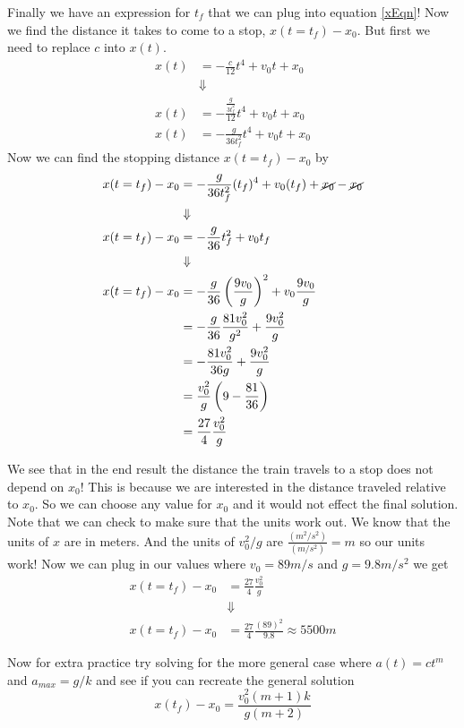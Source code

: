 \documentclass[11pt]{article}
\begin{document}
Finally we have an expression for $t_f$ that we can plug into equation \ref{xEqn}! Now we 
find the distance it takes to come to a stop, $x(t=t_f) - x_0$. But first we need to
replace $c$ into $x(t)$.
\begin{align*}
x(t) &= -\frac{c}{12}t^4 + v_0t + x_0\\
&\Downarrow\\
x(t) &= -\frac{\frac{g}{3t_f^2}}{12}t^4 + v_0t + x_0\\
x(t) &= -\frac{g}{36t_f^2}t^4 + v_0t + x_0
\end{align*}
Now we can find the stopping distance $x(t=t_f) - x_0$ by
\begin{align*}
x(t=t_f) - x_0 &= -\frac{g}{36t_f^2}(t_f)^4 + v_0(t_f) + \cancel{x_0} - \cancel{x_0}\\
&\Downarrow\\
x(t=t_f) - x_0 &= -\frac{g}{36}t_f^2 + v_0t_f\\
&\Downarrow\\
x(t=t_f) - x_0 &= -\frac{g}{36}\left(\frac{9v_0}{g}\right)^2 + v_0\frac{9v_0}{g}\\
&= -\frac{g}{36}\frac{81v_0^2}{g^2} + \frac{9v_0^2}{g}\\
&= -\frac{81v_0^2}{36g}  + \frac{9v_0^2}{g}\\
&= \frac{v_0^2}{g}\left(9-\frac{81}{36}\right)\\
&= \frac{27}{4}\frac{v_0^2}{g}
\end{align*}

We see that in the end result the distance the train travels to a stop does not depend on 
$x_0$! This is because we are interested in the distance traveled relative to $x_0$. So we
can choose any value for $x_0$ and it would not effect the final solution. 
Note that we can check to make sure that the units work out. We know that the units of $x$ 
are in meters. And the units of $v_0^2/g$ are $\frac{(m^2/s^2)}{(m/s^2)} = m$ so our units
work! Now we can plug in our values where $v_0 = 89\unit{m/s}$ and $g=9.8\unit{m/s^2}$ we 
get
\begin{align*}
x(t=t_f) - x_0 &= \frac{27}{4}\frac{v_0^2}{g}\\
&\Downarrow\\
x(t=t_f) - x_0 &= \frac{27}{4}\frac{(89)^2}{9.8} \approx 5500\unit{m}
\end{align*}

Now for extra practice try solving for the more general case where $a(t) = ct^{m}$ and 
$a_{max} = g/k$ and see if you can recreate the general solution
$$x(t_f) - x_0 = \frac{v_0^2(m+1)k}{g(m+2)}$$
\end{document}
